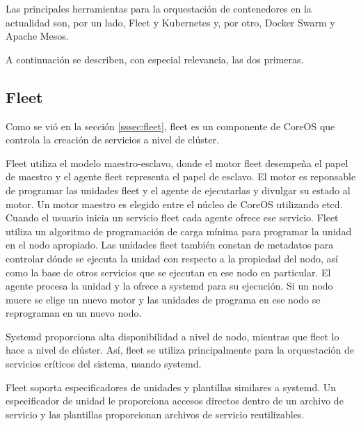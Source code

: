 Las principales herramientas para la orquestación de contenedores en la actualidad son, por un lado, Fleet y Kubernetes y, por otro, Docker Swarm y Apache Mesos.

A continuación se describen, con especial relevancia, las dos primeras.

\subsection{Fleet}

Como se vió en la sección \ref{sssec:fleet}, fleet es un componente de CoreOS que controla la creación de servicios a nivel de clúster.

Fleet utiliza el modelo maestro-esclavo, donde el motor fleet desempeña el papel de maestro y el agente fleet representa el papel de esclavo. El motor es reponsable de programar las unidades fleet y el agente de ejecutarlas y divulgar su estado al motor. Un motor maestro es elegido entre el núcleo de CoreOS utilizando etcd. Cuando el usuario inicia un servicio fleet cada agente ofrece ese servicio. Fleet utiliza un algoritmo de programación de carga mínima para programar la unidad en el nodo apropiado. Las unidades fleet también constan de metadatos para controlar dónde se ejecuta la unidad con respecto a la propiedad del nodo, así como la base de otros servicios que se ejecutan en ese nodo en particular. El agente procesa la unidad y la ofrece a systemd para su ejecución. Si un nodo muere se elige un nuevo motor y las unidades de programa en ese nodo se reprograman en un nuevo nodo. 

Systemd proporciona alta disponibilidad a nivel de nodo, mientras que fleet lo hace a nivel de clúster. Así, fleet se utiliza principalmente para la orquestación de servicios críticos del sistema, usando systemd. 

Fleet soporta especificadores de unidades y plantillas similares a systemd. Un especificador de unidad le proporciona accesos directos dentro de un archivo de servicio y las plantillas proporcionan archivos de servicio reutilizables.

